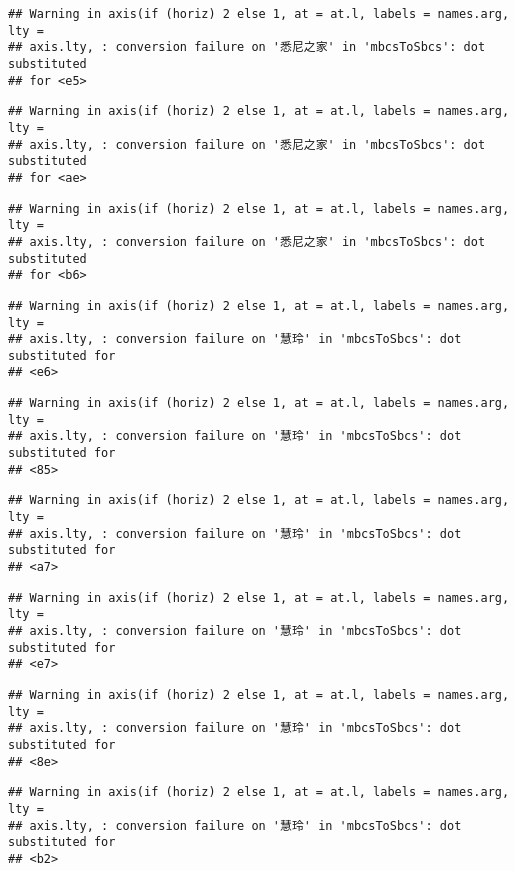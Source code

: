 \documentclass[
]{article}
\begin{document}
\begin{verbatim}
## Warning in axis(if (horiz) 2 else 1, at = at.l, labels = names.arg, lty =
## axis.lty, : conversion failure on '悉尼之家' in 'mbcsToSbcs': dot substituted
## for <e5>
\end{verbatim}

\begin{verbatim}
## Warning in axis(if (horiz) 2 else 1, at = at.l, labels = names.arg, lty =
## axis.lty, : conversion failure on '悉尼之家' in 'mbcsToSbcs': dot substituted
## for <ae>
\end{verbatim}

\begin{verbatim}
## Warning in axis(if (horiz) 2 else 1, at = at.l, labels = names.arg, lty =
## axis.lty, : conversion failure on '悉尼之家' in 'mbcsToSbcs': dot substituted
## for <b6>
\end{verbatim}

\begin{verbatim}
## Warning in axis(if (horiz) 2 else 1, at = at.l, labels = names.arg, lty =
## axis.lty, : conversion failure on '慧玲' in 'mbcsToSbcs': dot substituted for
## <e6>
\end{verbatim}

\begin{verbatim}
## Warning in axis(if (horiz) 2 else 1, at = at.l, labels = names.arg, lty =
## axis.lty, : conversion failure on '慧玲' in 'mbcsToSbcs': dot substituted for
## <85>
\end{verbatim}

\begin{verbatim}
## Warning in axis(if (horiz) 2 else 1, at = at.l, labels = names.arg, lty =
## axis.lty, : conversion failure on '慧玲' in 'mbcsToSbcs': dot substituted for
## <a7>
\end{verbatim}

\begin{verbatim}
## Warning in axis(if (horiz) 2 else 1, at = at.l, labels = names.arg, lty =
## axis.lty, : conversion failure on '慧玲' in 'mbcsToSbcs': dot substituted for
## <e7>
\end{verbatim}

\begin{verbatim}
## Warning in axis(if (horiz) 2 else 1, at = at.l, labels = names.arg, lty =
## axis.lty, : conversion failure on '慧玲' in 'mbcsToSbcs': dot substituted for
## <8e>
\end{verbatim}

\begin{verbatim}
## Warning in axis(if (horiz) 2 else 1, at = at.l, labels = names.arg, lty =
## axis.lty, : conversion failure on '慧玲' in 'mbcsToSbcs': dot substituted for
## <b2>
\end{verbatim}
\end{document}
